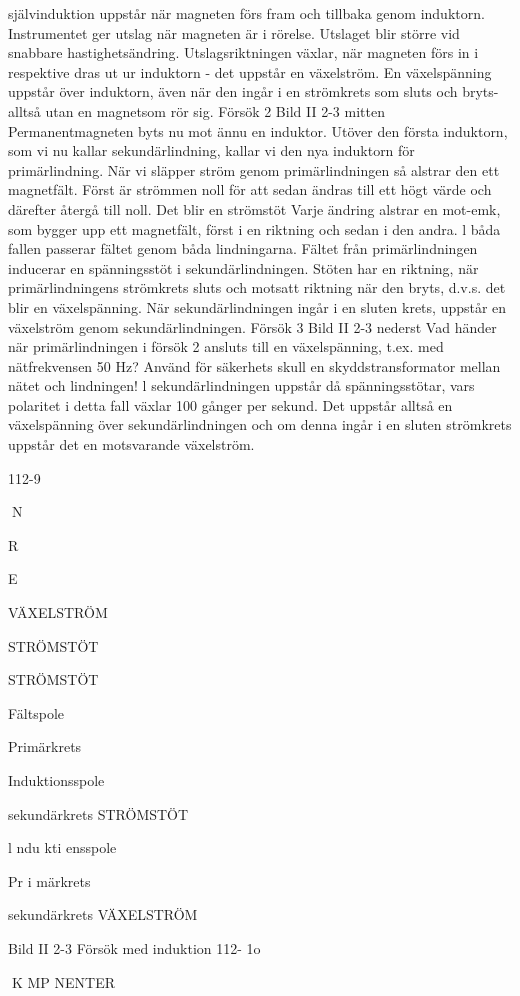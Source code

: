 självinduktion uppstår när magneten förs
fram och tillbaka genom induktorn.
Instrumentet ger utslag när magneten är
i rörelse. Utslaget blir större vid snabbare
hastighetsändring. Utslagsriktningen växlar,
när magneten förs in i respektive dras ut ur
induktorn - det uppstår en växelström.
En växelspänning uppstår över induktorn,
även när den ingår i en strömkrets som sluts
och bryts-alltså utan en magnetsom rör sig.
Försök 2
Bild II 2-3 mitten
Permanentmagneten byts nu mot ännu en
induktor. Utöver den första induktorn, som vi
nu kallar sekundärlindning, kallar vi den nya
induktorn för primärlindning.
När vi släpper ström genom primärlindningen så alstrar den ett magnetfält. Först är
strömmen noll för att sedan ändras till ett
högt värde och därefter återgå till noll. Det
blir en strömstöt
Varje ändring alstrar en mot-emk, som
bygger upp ett magnetfält, först i en riktning
och sedan i den andra. l båda fallen passerar
fältet genom båda lindningarna. Fältet från
primärlindningen inducerar en spänningsstöt i sekundärlindningen. Stöten har en riktning, när primärlindningens strömkrets sluts
och motsatt riktning när den bryts, d.v.s. det
blir en växelspänning. När sekundärlindningen ingår i en sluten krets, uppstår en
växelström genom sekundärlindningen.
Försök 3
Bild II 2-3 nederst
Vad händer när primärlindningen i försök 2
ansluts till en växelspänning, t.ex. med nätfrekvensen 50 Hz? Använd för säkerhets
skull en skyddstransformator mellan nätet
och lindningen!
l sekundärlindningen uppstår då spänningsstötar, vars polaritet i detta fall växlar
100 gånger per sekund. Det uppstår alltså en
växelspänning över sekundärlindningen och
om denna ingår i en sluten strömkrets uppstår det en motsvarande växelström.

112-9

N

R

E

VÄXELSTRÖM

STRÖMSTÖT

STRÖMSTÖT

Fältspole

Primärkrets

Induktionsspole

sekundärkrets
STRÖMSTÖT

l ndu kti ensspole

Pr i märkrets

sekundärkrets
VÄXELSTRÖM

Bild II 2-3 Försök med induktion
112- 1o

K MP NENTER

